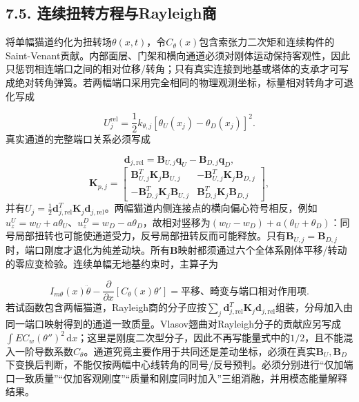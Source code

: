 \documentclass[UTF8,a4paper,11pt,fontset=none]{ctexart}
\begin{document}
\subsection*{7.5. 连续扭转方程与Rayleigh商}
将单幅猫道约化为扭转场\(\theta(x,\allowbreak t)\)\allowbreak{}，令\(C_\theta(x)\)\allowbreak{}包含索张力二次矩和连续构件的Saint-Venant贡献。内部面层、门架和横向通道必须对刚体运动保持客观性，因此只惩罚相连端口之间的相对位移/转角；只有真实连接到地基或塔体的支承才可写成绝对转角弹簧。若两幅端口采用完全相同的物理观测坐标，标量相对转角才可退化写成\par
\[
U_{j}^{\mathrm{rel}}
=\frac12k_{\theta,j}
\left[\theta_U(x_j)-\theta_D(x_j)\right]^2.
\]
真实通道的完整端口关系必须写成\par
\[
\mathbf d_{j,\mathrm{rel}}
=\mathbf B_{U,j}\mathbf q_U-\mathbf B_{D,j}\mathbf q_D,
\]
\[
\mathbf K_{p,j}=
\begin{bmatrix}
\mathbf B_{U,j}^{T}\mathbf K_j\mathbf B_{U,j}&
-\mathbf B_{U,j}^{T}\mathbf K_j\mathbf B_{D,j}\\
-\mathbf B_{D,j}^{T}\mathbf K_j\mathbf B_{U,j}&
\mathbf B_{D,j}^{T}\mathbf K_j\mathbf B_{D,j}
\end{bmatrix},
\]
并有\(U_j=\tfrac12\mathbf d_{j,\allowbreak \mathrm{rel}}^T\mathbf K_j\mathbf d_{j,\allowbreak \mathrm{rel}}\)\allowbreak{}。两幅猫道内侧连接点的横向偏心符号相反，例如\(u_z^U=w_U+a\theta_U\)\allowbreak{}、\(u_z^D=w_D-a\theta_D\)\allowbreak{}，故相对竖移为\((w_U-w_D)+a(\theta_U+\theta_D)\)\allowbreak{}：同号局部扭转也可能使通道受力，反号局部扭转反而可能释放。只有\(\mathbf B_{U,\allowbreak j}=\mathbf B_{D,\allowbreak j}\)\allowbreak{}时，端口刚度才退化为纯差动块。所有\(\mathbf B\)\allowbreak{}映射都须通过六个全体系刚体平移/转动的零应变检验。连续单幅无地基约束时，主算子为\par
\[
I_{m\theta}(x)\ddot\theta
-\frac{\partial}{\partial x}
\left[C_\theta(x)\theta'\right]
=\text{平移、畸变与端口相对作用项}.
\]
若试函数包含两幅猫道，Rayleigh商的分子应按\(\sum_j\mathbf d_{j,\allowbreak \mathrm{rel}}^T\mathbf K_j\mathbf d_{j,\allowbreak \mathrm{rel}}\)\allowbreak{}组装，分母加入由同一端口映射得到的通道一致质量。Vlasov翘曲对Rayleigh分子的贡献应另写成\(\int EC_w(\theta'')^2\,\allowbreak \mathrm dx\)\allowbreak{}；这里是刚度二次型分子，因此不再写能量式中的\(1/2\)\allowbreak{}，且不能混入一阶导数系数\(C_\theta\)\allowbreak{}。通道究竟主要作用于共同还是差动坐标，必须在真实\(\mathbf B_U,\allowbreak \mathbf B_D\)\allowbreak{}下变换后判断，不能仅按两幅中心线转角的同号/反号预判。必须分别进行“仅加端口一致质量”“仅加客观刚度”“质量和刚度同时加入”三组消融，并用模态能量解释结果。\par
{}
\end{document}
